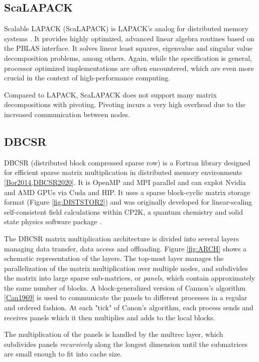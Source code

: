 \subsection{ScaLAPACK}

Scalable LAPACK (ScaLAPACK) is LAPACK's analog for distributed memory systems \cite{Sca2021}. It provides highly optimized, advanced linear algebra routines based on the PBLAS interface.  It solves linear least squares, eigenvalue and singular value decomposition problems, among others. Again, while the specification is general, processor optimized implementations are often encountered, which are even more crucial in the context of high-performance computing. 

Compared to LAPACK, ScaLAPACK does not support many matrix decompositions with pivoting. Pivoting incurs a very high overhead due to the increased communication between nodes.

\subsection{DBCSR}

DBCSR (distributed block compressed sparse row) is a Fortran library designed for efficient sparse matrix multiplication in distributed memory environments \ref{Bor2014,DBCSR2020}. It is OpenMP and MPI parallel and can explot Nvidia and AMD GPUs via Cuda and HIP. It uses a sparse block-cyclic matrix storage format (Figure \ref{fig:DISTSTOR2}) and was originally developed for linear-scaling self-consistent field calculations within CP2K, a quantum chemistry and solid state physics software package \cite{Hut2014,Sch2016}. 

The DBCSR matrix multiplication architecture is divided into several layers managing data transfer, data access and offloading. Figure \ref{fig:ARCH} shows a schematic representation of the layers. The top-most layer manages the parallelization of the matrix multiplication over multiple nodes, and subdivides the matrix into large sparse sub-matrices, or \emph{panels}, which contain approximately the same number of blocks. A block-generalized version of Cannon's algorithm \ref{Can1969} is used to communicate the panels to different processes in a regular and ordered fashion. At each "tick" of Canon's algorithm, each process  sends and receives panels which it then multiplies and adds to the local blocks. 

The multiplication of the panels is handled by the multrec layer, which subdivides panels \emph{recursively} along the longest dimension until the submatrices are small enough to fit into cache size.

